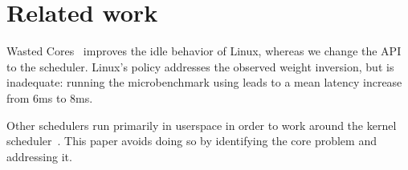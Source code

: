 \section{Related work}

Wasted Cores~\cite{wasted-cores} improves the idle behavior of Linux, whereas we
change the API to the scheduler. Linux's \schedidle{} policy addresses the
observed weight inversion, but is inadequate: running the microbenchmark using
\schedidle{} leads to a mean latency increase from 6ms to 8ms.

Other schedulers run primarily in userspace in order to work around the kernel
scheduler~\cite{perfiso,caladan,skyloft}. This paper avoids doing so by
identifying the core problem and addressing it.